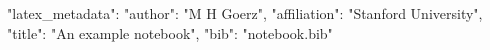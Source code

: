 "latex_metadata": {
    "author": "M H Goerz",
    "affiliation": "Stanford University",
    "title": "An example notebook",
    "bib": "notebook.bib"
}